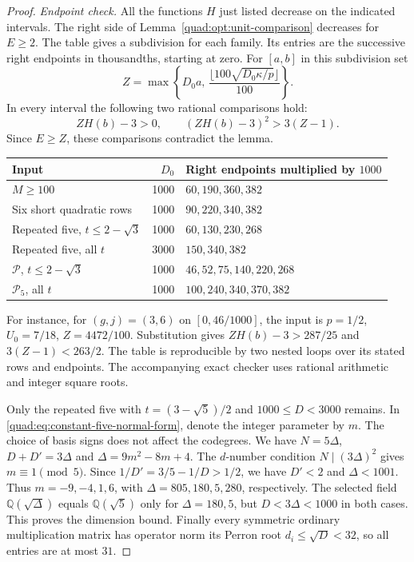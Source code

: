 \documentclass[11pt,a4paper]{article}
\theoremstyle{definition}\newtheorem{definition}[theorem]{Definition}
\theoremstyle{remark}\newtheorem{remark}[theorem]{Remark}
\newcommand{\Q}{\mathbb Q}
\numberwithin{equation}{section}
\begin{document}
\begin{proof}
\emph{Endpoint check.}
All the functions $H$ just listed decrease on the indicated intervals.
The right side of Lemma~\ref{quad:opt:unit-comparison} decreases for
$E\ge2$. The table gives a subdivision for each family. Its entries are
the successive right endpoints in thousandths, starting at zero.
For $[a,b]$ in this subdivision set
\[
 Z=\max\left\{D_0a,\,
  \frac{\lfloor100\sqrt{D_0\kappa/p}\rfloor}{100}\right\}.
\]
In every interval the following two rational comparisons hold:
\[
 ZH(b)-3>0,\qquad (ZH(b)-3)^2>3(Z-1).
\]
Since $E\ge Z$, these comparisons contradict the lemma.
\begin{center}\small
\begin{tabular}{@{}lrl@{}}
\toprule
Input & $D_0$ & Right endpoints multiplied by $1000$\\\midrule
$M\ge100$ & 1000 & $60,190,360,382$\\
Six short quadratic rows & 1000 & $90,220,340,382$\\
Repeated five, $t\le2-\sqrt3$ & 1000 & $60,130,230,268$\\
Repeated five, all $t$ & 3000 & $150,340,382$\\
$\mathcal P$, $t\le2-\sqrt3$ & 1000 & $46,52,75,140,220,268$\\
$\mathcal P_5$, all $t$ & 1000 & $100,240,340,370,382$\\
\bottomrule
\end{tabular}
\end{center}
For instance, for $(g,j)=(3,6)$ on $[0,46/1000]$, the input is
$p=1/2$, $U_0=7/18$, $Z=4472/100$. Substitution gives
$ZH(b)-3>287/25$ and $3(Z-1)<263/2$.
The table is reproducible by two nested loops over its stated rows
and endpoints. The accompanying exact checker uses rational arithmetic
and integer square roots.

Only the repeated five with $t=(3-\sqrt5)/2$ and $1000\le D<3000$
remains. In \eqref{quad:eq:constant-five-normal-form}, denote the
integer parameter by $m$. The choice of basis signs does not affect
the codegrees. We have $N=5\Delta$, $D+D'=3\Delta$ and
$\Delta=9m^2-8m+4$. The $d$-number condition $N\mid(3\Delta)^2$
gives $m\equiv1\pmod5$. Since $1/D'=3/5-1/D>1/2$,
we have $D'<2$ and $\Delta<1001$. Thus $m=-9,-4,1,6$, with
$\Delta=805,180,5,280$, respectively. The selected field
$\Q(\sqrt\Delta)$ equals $\Q(\sqrt5)$ only for $\Delta=180,5$,
but $D<3\Delta<1000$ in both cases. This proves the dimension bound.
Finally every symmetric ordinary multiplication matrix has operator
norm its Perron root $d_i\le\sqrt D<32$, so all entries are at most $31$.
\end{proof}
\end{document}

